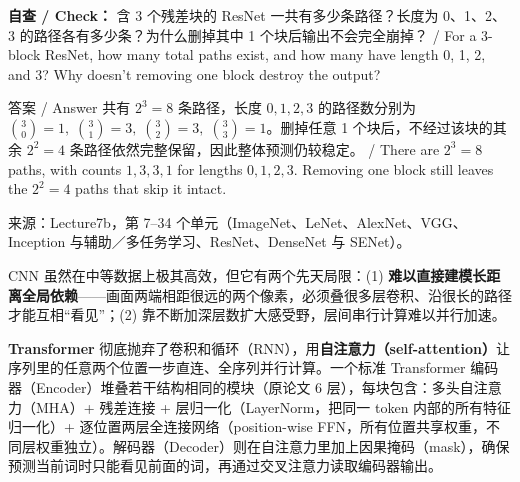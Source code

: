 
\textbf{自查 / Check：} 含 3 个残差块的 ResNet 一共有多少条路径？长度为 0、1、2、3 的路径各有多少条？为什么删掉其中 1 个块后输出不会完全崩掉？ / For a 3-block ResNet, how many total paths exist, and how many have length 0, 1, 2, and 3? Why doesn't removing one block destroy the output?

\begin{StudySolution}{答案 / Answer}
共有 $2^3=8$ 条路径，长度 $0,1,2,3$ 的路径数分别为 $\binom{3}{0}=1,\;\binom{3}{1}=3,\;\binom{3}{2}=3,\;\binom{3}{3}=1$。删掉任意 1 个块后，不经过该块的其余 $2^2=4$ 条路径依然完整保留，因此整体预测仍较稳定。 / There are $2^3=8$ paths, with counts $1, 3, 3, 1$ for lengths $0, 1, 2, 3$. Removing one block still leaves the $2^2=4$ paths that skip it intact.
\end{StudySolution}

来源：Lecture7b，第 7–34 个单元（ImageNet、LeNet、AlexNet、VGG、Inception 与辅助／多任务学习、ResNet、DenseNet 与 SENet）。



CNN 虽然在中等数据上极其高效，但它有两个先天局限：(1) \textbf{难以直接建模长距离全局依赖}——画面两端相距很远的两个像素，必须叠很多层卷积、沿很长的路径才能互相“看见”；(2) 靠不断加深层数扩大感受野，层间串行计算难以并行加速。

\textbf{Transformer} 彻底抛弃了卷积和循环（RNN），用\textbf{自注意力（self-attention）}让序列里的任意两个位置一步直连、全序列并行计算。一个标准 Transformer 编码器（Encoder）堆叠若干结构相同的模块（原论文 6 层），每块包含：多头自注意力（MHA）+ 残差连接 + 层归一化（LayerNorm，把同一 token 内部的所有特征归一化）+ 逐位置两层全连接网络（position-wise FFN，所有位置共享权重，不同层权重独立）。解码器（Decoder）则在自注意力里加上因果掩码（mask），确保预测当前词时只能看见前面的词，再通过交叉注意力读取编码器输出。



